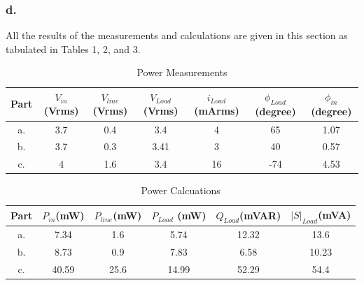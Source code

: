 \documentclass[letterpaper,12pt]{article}
\begin{document}
\subsubsection{d.}
All the results of the measurements and calculations are given in this section as tabulated in Tables 1, 2, and 3.
\begin{table}[H]
    \begin{center}
        \caption{Power Measurements}
        \vspace{2mm}
        \begin{tabular}{||c | c | c | c | c | c | c ||} 
            \hline
            Part & \(V_{in}\)\newline (Vrms) & \(V_{line}\)\newline (Vrms) & \(V_{Load}\) \newline (Vrms) &\(i_{Load}\)\newline (mArms) & \(\phi_{Load}\) \newline(degree)& \(\phi_{in}\)\newline(degree) \\ [0.5ex] 
            \hline\hline
            a. & 3.7 & 0.4   & 3.4 & 4& 65  & 1.07 \\ 
            \hline
            b. &3.7 &0.3  &3.41 &  3 & 40& 0.57    \\
            \hline
            c. &4 &1.6  &3.4 &16 &-74 & 4.53  \\ [1ex] 
            \hline
        \end{tabular}
\end{center}
\end{table}


\begin{table}[H]
    \begin{center}
        \caption{Power Calcuations}
        \vspace{2mm}
        \begin{tabular}{||c | c | c | c | c | c ||} 
            \hline
            Part & \(P_{in}\)\newline (mW) & \(P_{line}\)\newline (mW) & \(P_{Load}\) \newline (mW) &\(Q_{Load}\)\newline (mVAR) & \(|S|_{Load}\)\newline(mVA)   \\ [0.5ex] 
            \hline\hline
            a. &7.34 & 1.6 & 5.74 & 12.32 & 13.6   \\ 
            \hline
            b. &8.73 & 0.9 & 7.83 & 6.58 &  10.23   \\
            \hline
            c. & 40.59 & 25.6 & 14.99 & 52.29  & 54.4   \\ [1ex] 
            \hline
        \end{tabular}
\end{center}
\end{table}
\end{document}
